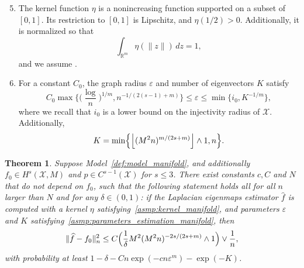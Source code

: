\documentclass{article}
\newcommand{\Reals}{\mathbb{R}}
\newcommand{\floor}[1]{\left\lfloor #1 \right\rfloor}
\newcommand{\1}{\mathbf{1}}
\newcommand{\mc}[1]{\mathcal{#1}}
\newcommand{\wh}[1]{\widehat{#1}}
\theoremstyle{alden}
\theoremstyle{aldenthm}
\newtheorem{theorem}{Theorem}
\theoremstyle{definition}
\theoremstyle{remark}
\begin{document}
\begin{enumerate}[label=(P\arabic*)]
	\setcounter{enumi}{4}
	\item 
	\label{asmp:kernel_manifold}
	The kernel function $\eta$ is a nonincreasing function supported on a subset of $[0,1]$. Its restriction to $[0,1]$ is Lipschitz, and $\eta(1/2) > 0$. Additionally, it is normalized so that
	\begin{equation*}
	\int_{\Reals^m} \eta(\|z\|) \,dz = 1,
	\end{equation*}
	and we assume \smash{$\int_{\Reals^m} \|x\|^2 \eta(\|x\|) \,dx < \infty$}.
	\item 
	\label{asmp:parameters_estimation_manifold}
	For a constant $C_0$, the graph radius $\varepsilon$ and number of eigenvectors $K$ satisfy
	\begin{equation}
	\label{eqn:radius_estimation_manifold}
	C_0\max\biggl\{\biggl(\frac{\log}{n}\biggr)^{1/m}, n^{-1/(2(s - 1) + m)}\biggr\} \leq \varepsilon \leq \min\{i_0, K^{-1/m}\},
	\end{equation}
	where we recall that $i_0$ is a lower bound on the injectivity radius of $\mc{X}$. Additionally,
	\begin{equation*}
	K = \min\Bigl\{\floor{(M^2n)^{m/(2s + m)}} \wedge 1,n \Bigr\}.
	\end{equation*}
\end{enumerate}

\begin{theorem}
	\label{thm:laplacian_eigenmaps_estimation_manifold}
	Suppose Model~\ref{def:model_manifold}, and additionally $f_0 \in H^s(\mc{X},M)$ and $p \in C^{s - 1}(\mc{X})$ for $s \leq 3$. There exist constants $c,C$ and $N$ that do not depend on $f_0$, such that the following statement holds all for all $n$ larger than $N$ and for any $\delta \in (0,1)$: if the Laplacian eigenmaps estimator $\wh{f}$ is computed with a kernel $\eta$ satisfying~\ref{asmp:kernel_manifold}, and parameters $\varepsilon$ and $K$ satisfying~\ref{asmp:parameters_estimation_manifold}, then
	\begin{equation}
	\label{eqn:laplacian_eigenmaps_estimation_manifold}
	\|\wh{f} - f_0\|_n^2 \leq C\Bigl(\frac{1}{\delta}M^2(M^2n)^{-2s/(2s + m)} \wedge 1\Bigr) \vee \frac{1}{n},
	\end{equation}
	with probability at least $1 - \delta - Cn\exp(-cn\varepsilon^m) - \exp(-K)$.
\end{theorem}
\end{document}
